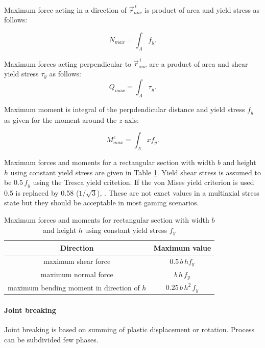 \documentclass{jcgt}
\begin{document}
Maximum force acting in a direction of $\vec{r}_{anc}^{\,i} $
is product of area and yield stress as follows:

\begin{equation} \label{eq:fN}
N_{max}= \int_A f_y.
\end{equation}

Maximum forces acting perpendicular to $\vec{r}_{anc}^{\,i} $
are a product of area and shear yield stress $\tau_y$ as follows:
\begin{equation} \label{eq:fQ}
Q_{max}= \int_A \tau_y.
\end{equation}

Maximum moment is integral of the perpdendicular distance 
and yield stress $f_y$ as given for the moment around  the $z$-axis:

\begin{equation} \label{eq:Mz}
M_{max}^z= \int_A x f_y.
\end{equation}


Maximum forces and moments for a
rectangular section with width $b$ and height $h$ using constant yield stress
are given in Table \ref{tab:maxForces}.
Yield shear stress is assumed to be $ 0.5\, f_y$ using the Tresca yield critetion.
If the von Mises yield criterion is used 0.5 is replaced by 0.58 ($1/\sqrt{3}$), \cite{dowling}.
These are not exact values in a multiaxial stress state but they
should be acceptable in most gaming scenarios.

\begin {table}
\small
\begin{center}
\begin{tabular}{| c| c|}
\hline
{\bf Direction} & {\bf Maximum value}  \\ \hline
maximum shear force & $0.5\, b\, h f_y$ \\ \hline
maximum normal force & $b\, h\, f_y$  \\ \hline
maximum bending moment in direction of $h$& $0.25\, b\, h^2 \, f_y$  \\ \hline
\end{tabular}
\end{center}
\caption{Maximum forces and moments for 
rectangular section with width $b$ and height $h$ using constant yield stress $f_y$}
\label{tab:maxForces} 
\end {table}

\paragraph{Joint breaking}
Joint breaking is based on summing of plastic displacement or rotation.
Process can be subdivided few phases.
\end{document}
